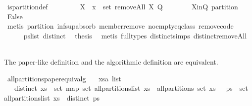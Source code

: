 \begin{isabellebody}
\ is{\isacharunderscore}partition{\isacharunderscore}def\ \isacommand{{\isachardot}}\isamarkupfalse%
\isanewline
\ \ \ \ \ \ \isamarkupfalse%
\ {\isachardoublequoteopen}X\ {\isasymunion}\ {\isacharbraceleft}x{\isacharbraceright}\ {\isasymin}\ set\ {\isacharparenleft}removeAll\ X\ Q{\isacharparenright}{\isachardoublequoteclose}\isanewline
\ \ \ \ \ \ \isamarkupfalse%
\ X{\isacharunderscore}in{\isacharunderscore}Q\ partition\ \isamarkupfalse%
\ False\ \isamarkupfalse%
\ {\isacharparenleft}metis\ partition{\isacharprime}\ inf{\isacharunderscore}sup{\isacharunderscore}absorb\ member{\isacharunderscore}remove\ no{\isacharunderscore}empty{\isacharunderscore}eq{\isacharunderscore}class\ remove{\isacharunderscore}code{\isacharparenleft}{}{\isacharparenright}{\isacharparenright}\isanewline
\ \ \ \ \isamarkupfalse%
\isanewline
\ \ \ \ \isamarkupfalse%
\ ps{\isacharunderscore}list\ distinct\ \isamarkupfalse%
\ {\isacharquery}thesis\ \isamarkupfalse%
\ {\isacharparenleft}metis\ {\isacharparenleft}full{\isacharunderscore}types{\isacharparenright}\ distinct{\isachardot}simps{\isacharparenleft}{}{\isacharparenright}\ distinct{\isacharunderscore}removeAll{\isacharparenright}\isanewline
\ \ \isamarkupfalse%
\isanewline
{}\isamarkupfalse%
%
\endisatagproof
{\isafoldproof}%
%
\isadelimproof
%
\endisadelimproof
%
\begin{isamarkuptext}%
The paper-like definition  and the algorithmic definition
   are equivalent.%
\end{isamarkuptext}%
\isamarkuptrue%
\isamarkupfalse%
\ all{\isacharunderscore}partitions{\isacharunderscore}paper{\isacharunderscore}equiv{\isacharunderscore}alg{\isacharprime}{\isacharcolon}\isanewline
\ \ \ xs{\isacharcolon}{\isacharcolon}{\isachardoublequoteopen}{\isacharprime}a\ list{\isachardoublequoteclose}\isanewline
\ \ \ {\isachardoublequoteopen}distinct\ xs\ {\isasymLongrightarrow}\ {\isacharparenleft}{\isacharparenleft}set\ {\isacharparenleft}map\ set\ {\isacharparenleft}all{\isacharunderscore}partitions{\isacharunderscore}list\ xs{\isacharparenright}{\isacharparenright}\ {\isacharequal}\ all{\isacharunderscore}partitions\ {\isacharparenleft}set\ xs{\isacharparenright}{\isacharparenright}\ {\isasymand}\ {\isacharparenleft}{\isasymforall}\ ps\ {\isasymin}\ set\ {\isacharparenleft}all{\isacharunderscore}partitions{\isacharunderscore}list\ xs{\isacharparenright}\ {\isachardot}\ distinct\ ps{\isacharparenright}{\isacharparenright}{\isachardoublequoteclose}\isanewline

\end{isabellebody}
